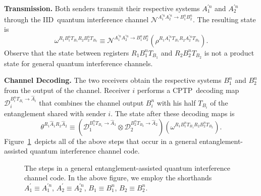 \documentclass[aps,11pt,twoside,letterpaper]{article}
\begin{document}
		\textbf{Transmission.} Both senders transmit their respective systems
		$A_{1}^{\prime n}$ and $A_{2}^{\prime n}$ through the IID\ quantum
		interference channel $\mathcal{N}^{A_{1}^{\prime n}A_{2}^{\prime n}\rightarrow
		B_{1}^{n}B_{2}^{n}}$. The resulting state is%
		\[
		\omega^{R_{1}B_{1}^{n}T_{B_{1}}R_{2}B_{2}^{n}T_{B_{2}}}\equiv\mathcal{N}%
		^{A_{1}^{\prime n}A_{2}^{\prime n}\rightarrow B_{1}^{n}B_{2}^{n}}(\rho
		^{R_{1}A_{1}^{\prime n}T_{B_{1}}R_{2}A_{2}^{\prime n}T_{B_{2}}}).
		\]
		Observe that the state between registers $R_{1}B_{1}^{n}T_{B_{1}}$ and
		$R_{2}B_{2}^{n}T_{B_{2}}$ is not a product state for general quantum
		interference channels.

		\textbf{Channel Decoding.} The two receivers obtain the respective systems
		$B_{1}^{n}$ and $B_{2}^{n}$ from the output of the channel. Receiver $i$
		performs a CPTP\ decoding map $\mathcal{D}_{i}^{B_{i}^{n}T_{B_{i}}%
		\rightarrow\hat{A}_{i}}$ that combines the channel output $B_{i}^{n}$ with his
		half $T_{B_{i}}$ of the entanglement shared with sender $i$. The state after
		these decoding maps is%
		\[
		\theta^{R_{1}\hat{A}_{1}R_{2}\hat{A}_{2}}\equiv(\mathcal{D}_{1}^{B_{1}%
		^{n}T_{B_{1}}\rightarrow\hat{A}_{1}}\otimes\mathcal{D}_{2}^{B_{2}^{n}T_{B_{2}%
		}\rightarrow\hat{A}_{2}})(\omega^{R_{1}B_{1}^{n}T_{B_{1}}R_{2}B_{2}%
		^{n}T_{B_{2}}}).
		\]
		Figure~\ref{fig:interference-protocol}\ depicts all of the above steps that
		occur in a general entanglement-assisted quantum interference channel code.%
		\begin{figure}
		[ptb]
		\begin{center}
		\caption{The steps in a general entanglement-assisted quantum interference
		channel code. In the above figure, we employ the shorthands $A_{1}^{\prime
		}\equiv A_{1}^{\prime n}$, $A_{2}^{\prime}\equiv A_{2}^{\prime n}$,
		$B_{1}\equiv B_{1}^{n}$, $B_{2}\equiv B_{2}^{n}$.}%
		\label{fig:interference-protocol}%
		\end{center}
		\end{figure}
\end{document}
